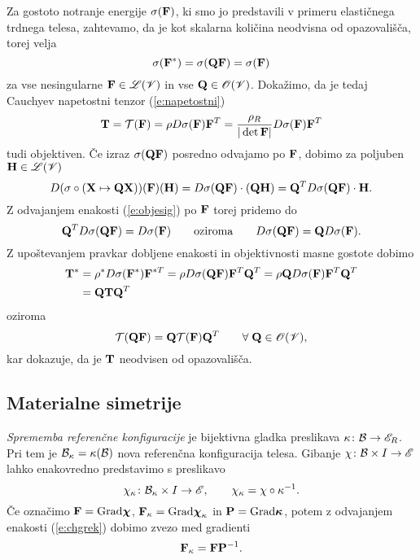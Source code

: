 Za gostoto notranje energije $\sigma(\mathbf F)$, ki smo jo predstavili v primeru
elastičnega trdnega telesa, zahtevamo, da je kot skalarna količina neodvisna
od opazovališča, torej velja
\begin{equation} \label{e:objesig}
	\sigma(\mathbf F^*)=\sigma(\mathbf Q\mathbf F)=\sigma(\mathbf F)
\end{equation}
za vse nesingularne $\mathbf F\in\mathscr L(\mathscr V)$ in vse $\mathbf Q\in\mathscr{O}(\mathscr V)$.
Dokažimo, da je tedaj Cauchyev napetostni tenzor (\ref{e:napetostni})
\[
	\mathbf T=\mathcal{T}(\mathbf F)=\rho D\sigma(\mathbf F)\mathbf F^T
	=\frac{\rho_R}{|\det\mathbf F|} D\sigma(\mathbf F)\mathbf F^T
\]
tudi objektiven. Če izraz $\sigma(\mathbf Q\mathbf F)$ posredno odvajamo po $\mathbf F$,
dobimo za poljuben $\mathbf H\in\mathscr L(\mathscr V)$
\[
	D(\sigma\circ(\mathbf X\mapsto\mathbf Q\mathbf X))(\mathbf F)(\mathbf H)=
	D\sigma(\mathbf Q\mathbf F)\cdot(\mathbf Q\mathbf H)=\mathbf Q^T D\sigma(\mathbf Q\mathbf F)\cdot\mathbf H.
\]
Z odvajanjem enakosti (\ref{e:objesig}) po $\mathbf F$ torej pridemo do
\[
	\mathbf Q^T D\sigma(\mathbf Q\mathbf F) = D\sigma(\mathbf F)\qquad\textrm{oziroma}
	\qquad D\sigma(\mathbf Q\mathbf F) = \mathbf QD\sigma(\mathbf F).
\]
Z upoštevanjem pravkar dobljene enakosti in objektivnosti masne gostote dobimo
\begin{align*}
	\mathbf T^*&=\rho^* D\sigma(\mathbf F^*)\mathbf F^{*T}
	=\rho D\sigma(\mathbf Q\mathbf F)\mathbf F^{T}\mathbf Q^{T}
	=\rho \mathbf Q D\sigma(\mathbf F)\mathbf F^{T}\mathbf Q^{T} \nonumber \\
	&=\mathbf Q\mathbf T\mathbf Q^{T}
\end{align*}
oziroma
\[
	\mathcal{T}(\mathbf Q\mathbf F)=\mathbf Q\mathcal{T}(\mathbf F)\mathbf Q^{T}\qquad\forall\;\mathbf Q\in\mathscr{O}(\mathscr V),
\]
kar dokazuje, da je $\mathbf T$ neodvisen od opazovališča.


\subsection{Materialne simetrije}


\emph{Sprememba referenčne konfiguracije} je bijektivna gladka preslikava $\kappa\colon\mathcal B\to\mathscr E_R$.
Pri tem je $\mathcal B_{\kappa}=\kappa(\mathcal B)$ nova referenčna konfiguracija telesa. Gibanje
$\chi\colon\mathcal B\times I\to\mathscr E$ lahko enakovredno predstavimo s preslikavo
\begin{equation} \label{e:chgrek}
	\chi_{\kappa}\colon\mathcal B_{\kappa}\times I\to\mathscr E, \qquad
	\chi_{\kappa}=\chi\circ\kappa^{-1}.
\end{equation}
Če označimo $\mathbf F=\mathrm{Grad}\boldsymbol \chi$, $\mathbf F_{\kappa}=\mathrm{Grad}\boldsymbol \chi_{\kappa}$
in $\mathbf P=\mathrm{Grad}\boldsymbol \kappa$, potem z odvajanjem enakosti (\ref{e:chgrek})
dobimo zvezo med gradienti
\[
	\mathbf F_{\kappa}=\mathbf F\mathbf P^{-1}.
\]

